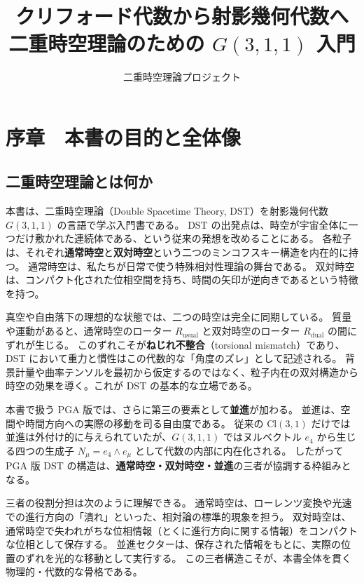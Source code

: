 \documentclass[dvipdfmx,a4paper,oneside]{jsbook}
\title{クリフォード代数から射影幾何代数へ\\
二重時空理論のための \(G(3,1,1)\) 入門}
\author{二重時空理論プロジェクト}
\date{}
\numberwithin{equation}{chapter}
\begin{document}
\maketitle
\tableofcontents
\newpage

\chapter*{序章　本書の目的と全体像}

\section*{二重時空理論とは何か}

本書は、二重時空理論（Double Spacetime Theory, DST）を射影幾何代数 \(G(3,1,1)\) の言語で学ぶ入門書である。
DST の出発点は、時空が宇宙全体に一つだけ敷かれた連続体である、という従来の発想を改めることにある。
各粒子は、それぞれ\textbf{通常時空}と\textbf{双対時空}という二つのミンコフスキー構造を内在的に持つ。
通常時空は、私たちが日常で使う特殊相対性理論の舞台である。
双対時空は、コンパクト化された位相空間を持ち、時間の矢印が逆向きであるという特徴を持つ。

真空や自由落下の理想的な状態では、二つの時空は完全に同期している。
質量や運動があると、通常時空のローター \(R_{\mathrm{usual}}\) と双対時空のローター \(R_{\mathrm{dual}}\) の間にずれが生じる。
このずれこそが\textbf{ねじれ不整合}（torsional mismatch）であり、DST において重力と慣性はこの代数的な「角度のズレ」として記述される。
背景計量や曲率テンソルを最初から仮定するのではなく、粒子内在の双対構造から時空の効果を導く。これが DST の基本的な立場である。

本書で扱う PGA 版では、さらに第三の要素として\textbf{並進}が加わる。
並進は、空間や時間方向への実際の移動を司る自由度である。
従来の \(\mathrm{Cl}(3,1)\) だけでは並進は外付け的に与えられていたが、\(G(3,1,1)\) ではヌルベクトル \(e_4\) から生じる四つの生成子 \(N_\mu = e_4 \wedge e_\mu\) として代数の内部に内在化される。
したがって PGA 版 DST の構造は、\textbf{通常時空・双対時空・並進}の三者が協調する枠組みとなる。

三者の役割分担は次のように理解できる。
通常時空は、ローレンツ変換や光速での進行方向の「潰れ」といった、相対論の標準的現象を担う。
双対時空は、通常時空で失われがちな位相情報（とくに進行方向に関する情報）をコンパクトな位相として保存する。
並進セクターは、保存された情報をもとに、実際の位置のずれを光的な移動として実行する。
この三者構造こそが、本書全体を貫く物理的・代数的な骨格である。
\end{document}
